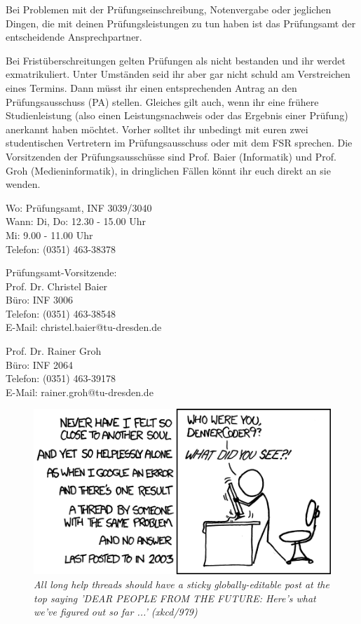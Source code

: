 Bei Problemen mit der Prüfungseinschreibung, Notenvergabe oder jeglichen Dingen, die mit deinen Prüfungsleistungen zu tun haben ist das Prüfungsamt der entscheidende Ansprechpartner.

Bei Fristüberschreitungen gelten Prüfungen als nicht bestanden und ihr werdet exmatrikuliert.
Unter Umständen seid ihr aber gar nicht schuld am Verstreichen eines Termins.
Dann müsst ihr einen entsprechenden Antrag an den Prüfungsausschuss (PA) stellen.
Gleiches gilt auch, wenn ihr eine frühere Studienleistung (also einen Leistungsnachweis oder das Ergebnis einer Prüfung) anerkannt haben möchtet.
Vorher solltet ihr unbedingt mit euren zwei studentischen Vertretern im Prüfungsausschuss oder mit dem FSR sprechen.
Die Vorsitzenden der Prüfungsausschüsse sind Prof. Baier (Informatik) und Prof. Groh (Medieninformatik), in dringlichen Fällen könnt ihr euch direkt an sie wenden.

Wo: Prüfungsamt, INF 3039/3040 \\
Wann: Di, Do: 12.30 - 15.00 Uhr \\
Mi: 9.00 - 11.00 Uhr \\
Telefon: (0351) 463-38378

Prüfungsamt-Vorsitzende: \\
Prof. Dr. Christel Baier \\
Büro: INF 3006 \\
Telefon: (0351) 463-38548 \\
E-Mail: christel.baier@tu-dresden.de

Prof. Dr. Rainer Groh \\
Büro: INF 2064 \\
Telefon: (0351) 463-39178 \\
E-Mail: rainer.groh@tu-dresden.de

\begin{figure}[h!]
\centering \includegraphics[width=\linewidth]{img/xkcd/wisdom_of_the_ancients.png}
\caption*{{\small \textit{All long help threads should have a sticky globally-editable post at the top saying 'DEAR PEOPLE FROM THE FUTURE: Here's what we've figured out so far ...' (xkcd/979)}}}
\end{figure}
